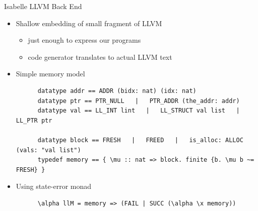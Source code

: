 \documentclass[fleqn]{beamer}
\begin{document}
{\begin{frame}[fragile]{Isabelle LLVM Back End}
  \begin{itemize}
   \item<2-> Shallow embedding of small fragment of LLVM
    \begin{itemize}
     \item just enough to express our programs
     \item code generator translates to actual LLVM text
    \end{itemize}
   \item<3-> Simple memory model {\small
    \begin{lstlisting}
      datatype addr == ADDR (bidx: nat) (idx: nat)
      datatype ptr == PTR_NULL   |   PTR_ADDR (the_addr: addr)
      datatype val == LL_INT lint   |   LL_STRUCT val list   |   LL_PTR ptr

      datatype block == FRESH   |   FREED   |   is_alloc: ALLOC (vals: "val list")
      typedef memory == { \mu :: nat => block. finite {b. \mu b ~= FRESH} }
    \end{lstlisting}}

   \item<4-> Using state-error monad
    \begin{lstlisting}
      \alpha llM = memory => (FAIL | SUCC (\alpha \x memory))
    \end{lstlisting}




  \end{itemize}
\end{frame}
}
\end{document}
